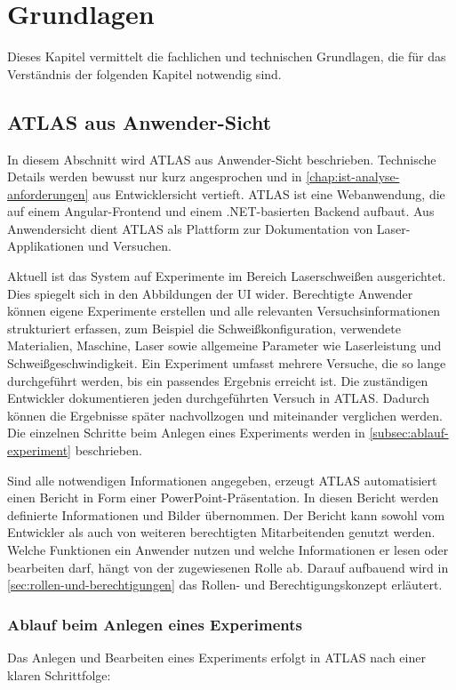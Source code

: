 \chapter{Grundlagen}
\label{chap:grundlagen}
Dieses Kapitel vermittelt die fachlichen und technischen Grundlagen, die für das Verständnis der folgenden Kapitel notwendig sind.

\section{ATLAS aus Anwender-Sicht}
In diesem Abschnitt wird \ac{ATLAS} aus Anwender-Sicht beschrieben. Technische Details werden bewusst nur kurz angesprochen und in \autoref{chap:ist-analyse-anforderungen} aus Entwicklersicht vertieft. \ac{ATLAS} ist eine Webanwendung, die auf einem Angular-Frontend und einem .NET-basierten Backend aufbaut. Aus Anwendersicht dient \ac{ATLAS} als Plattform zur Dokumentation von Laser-Applikationen und Versuchen.

Aktuell ist das System auf Experimente im Bereich Laserschweißen ausgerichtet. Dies spiegelt sich in den Abbildungen der \ac{UI} wider. Berechtigte Anwender können eigene Experimente erstellen und alle relevanten Versuchsinformationen strukturiert erfassen, zum Beispiel die Schweißkonfiguration, verwendete Materialien, Maschine, Laser sowie allgemeine Parameter wie Laserleistung und Schweißgeschwindigkeit. Ein Experiment umfasst mehrere Versuche, die so lange durchgeführt werden, bis ein passendes Ergebnis erreicht ist. Die zuständigen Entwickler dokumentieren jeden durchgeführten Versuch in \ac{ATLAS}. Dadurch können die Ergebnisse später nachvollzogen und miteinander verglichen werden. Die einzelnen Schritte beim Anlegen eines Experiments werden in \autoref{subsec:ablauf-experiment} beschrieben.

Sind alle notwendigen Informationen angegeben, erzeugt \ac{ATLAS} automatisiert einen Bericht in Form einer PowerPoint-Präsentation. In diesen Bericht werden definierte Informationen und Bilder übernommen. Der Bericht kann sowohl vom Entwickler als auch von weiteren berechtigten Mitarbeitenden genutzt werden.
Welche Funktionen ein Anwender nutzen und welche Informationen er lesen oder bearbeiten darf, hängt von der zugewiesenen Rolle ab. Darauf aufbauend wird in \autoref{sec:rollen-und-berechtigungen} das Rollen- und Berechtigungskonzept erläutert.


\subsection{Ablauf beim Anlegen eines Experiments}
\label{subsec:ablauf-experiment}
Das Anlegen und Bearbeiten eines Experiments erfolgt in \ac{ATLAS} nach einer klaren Schrittfolge:

